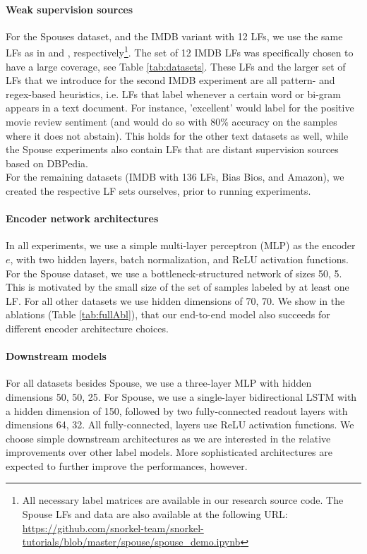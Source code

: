 \documentclass{article}
\begin{document}
\paragraph{Weak supervision sources}
For the Spouses dataset, and the IMDB variant with 12 LFs, we use the same LFs as in \cite{triplets} and \cite{TripletsMean}, respectively\footnote{All necessary label matrices are available in our research source code. The Spouse LFs and data are also available at the following URL:  \url{https://github.com/snorkel-team/snorkel-tutorials/blob/master/spouse/spouse_demo.ipynb}}.
The set of 12 IMDB LFs was specifically chosen to have a large coverage, see Table \ref{tab:datasets}.
These LFs and the larger set of LFs that we introduce for the second IMDB experiment are all pattern- and regex-based heuristics, i.e. LFs that label whenever a certain word or bi-gram appears in a text document. For instance, 'excellent' would label for the positive movie review sentiment (and would do so with $80\%$ accuracy on the samples where it does not abstain). This holds for the other text datasets as well, while the Spouse experiments also contain LFs that are distant supervision sources based on DBPedia. 
\\
For the remaining datasets (IMDB with 136 LFs, Bias Bios, and Amazon), we created the respective LF sets ourselves, prior to running experiments.

\paragraph{Encoder network architectures}
In all experiments, we use a simple multi-layer perceptron (MLP) as the encoder $e$, with two hidden layers, batch normalization, and ReLU activation functions. 
For the Spouse dataset, we use a bottleneck-structured network of sizes 50, 5. This is motivated by the small size of the set of samples labeled by at least one LF. For all other datasets we use hidden dimensions of 70, 70. We show in the ablations (Table \ref{tab:fullAbl}), that our end-to-end model also succeeds for different encoder architecture choices.
\paragraph{Downstream models}
For all datasets besides Spouse, we use a three-layer MLP with hidden dimensions 50, 50, 25.
For Spouse, we use a single-layer bidirectional LSTM with a hidden dimension of 150, followed by two fully-connected readout layers with dimensions 64, 32.
All fully-connected, layers use ReLU activation functions.
We choose simple downstream architectures as we are interested in the relative improvements over other label models. More sophisticated architectures are expected to further improve the performances, however. 
\end{document}
